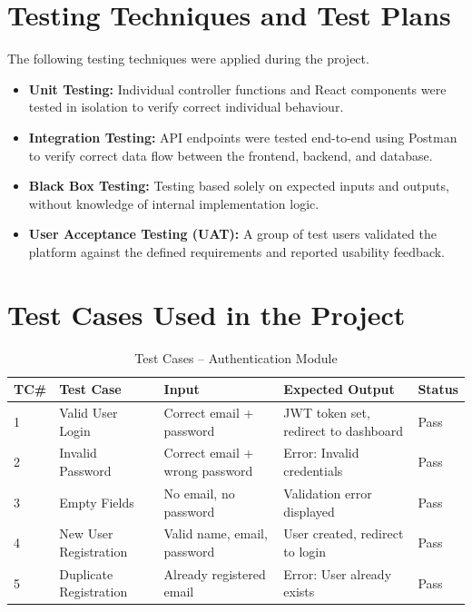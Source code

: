 \documentclass[12pt, a4paper, oneside]{report}
\begin{document}
\FloatBarrier

\section{Testing Techniques and Test Plans}

The following testing techniques were applied during the project.

\begin{itemize}[leftmargin=1.5cm, itemsep=2pt]
  \item \textbf{Unit Testing:} Individual controller functions and React components were tested in isolation to verify correct individual behaviour.
  \item \textbf{Integration Testing:} API endpoints were tested end-to-end using Postman to verify correct data flow between the frontend, backend, and database.
  \item \textbf{Black Box Testing:} Testing based solely on expected inputs and outputs, without knowledge of internal implementation logic.
  \item \textbf{User Acceptance Testing (UAT):} A group of test users validated the platform against the defined requirements and reported usability feedback.
\end{itemize}

\section{Test Cases Used in the Project}

\FloatBarrier
\begin{table}[H]
\centering
\caption{Test Cases -- Authentication Module}
\label{tab:tc_auth}
\renewcommand{\arraystretch}{1.3}
\begin{tabular}{|p{0.6cm}|p{3cm}|p{3.2cm}|p{3.2cm}|p{1.3cm}|}
\hline
\textbf{TC\#} & \textbf{Test Case}           & \textbf{Input}                     & \textbf{Expected Output}              & \textbf{Status} \\
\hline
1  & Valid User Login          & Correct email + password           & JWT token set, redirect to dashboard & Pass \\
\hline
2  & Invalid Password          & Correct email + wrong password     & Error: Invalid credentials           & Pass \\
\hline
3  & Empty Fields              & No email, no password              & Validation error displayed           & Pass \\
\hline
4  & New User Registration     & Valid name, email, password        & User created, redirect to login      & Pass \\
\hline
5  & Duplicate Registration    & Already registered email           & Error: User already exists           & Pass \\
\hline
\end{tabular}
\end{table}
\FloatBarrier
\end{document}
